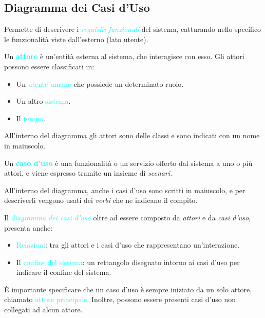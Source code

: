 \subsection{Diagramma dei Casi d'Uso}
Permette di descrivere i \emph{\textcolor{cyan}{requisiti funzionali}} del sistema, catturando nello specifico
le funzionalità viste dall'esterno (lato utente).

\begin{definition}[Attore]
    Un \textbf{\textcolor{cyan}{attore}} è un'entità esterna al sistema, che interagisce con esso.
    Gli attori possono essere classificati in:
    \begin{itemize}
        \item Un \textcolor{cyan}{utente umano} che possiede un determinato ruolo.
        \item Un altro \textcolor{cyan}{sistema}.
        \item Il \textcolor{cyan}{tempo}.
    \end{itemize}
    All'interno del diagramma gli attori sono delle classi e sono indicati con un nome in maiuscolo.
\end{definition}

\begin{definition}
    Un \textbf{\textcolor{cyan}{caso d'uso}} è una funzionalità o un servizio offerto dal sistema a uno o più attori, e viene
    espresso tramite un insieme di \emph{scenari}.

    All'interno del diagramma, anche i casi d'uso sono scritti in maiuscolo, e per descriverli vengono usati dei \emph{verbi} che ne indicano il compito.
\end{definition}

Il \emph{\textcolor{cyan}{diagramma dei casi d'uso}} oltre ad essere composto da
\emph{attori} e da \emph{casi d'uso}, presenta anche:
\begin{itemize}
    \item \textcolor{cyan}{Relazioni}: tra gli attori e i casi d'uso che rappresentano un'interazione.
    \item Il \textcolor{cyan}{confine del sistema}: un rettangolo disegnato intorno ai casi d'uso per indicare il confine del sistema.
\end{itemize}

È importante specificare che un caso d'uso è sempre iniziato da un solo attore, chiamato \textcolor{cyan}{attore principale}. Inoltre, possono
essere presenti casi d'uso non collegati ad alcun attore.

